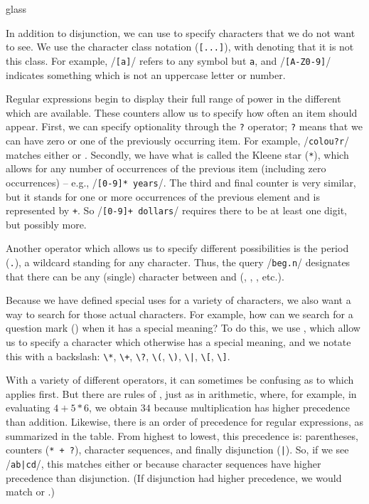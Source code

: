 \begin{tblsfilledsymbol}{}{glass}
\begin{underthehood}
In addition to disjunction, we can use  to specify
characters that we do not want to see.  We use the character class
notation (\texttt{[...]}), with {\A} denoting that it is not this class.  For example,
/\texttt{[{\A}a]}/ refers to any symbol but \texttt{a}, and
/\texttt{[{\A}A-Z0-9]}/ indicates something which is not an uppercase
letter or number.

Regular expressions begin to display their full range of power in the
different  which are available.  These counters
allow us to specify how often an item should appear.  First, we can
specify optionality through the \texttt{?} operator; \texttt{?} means
that we can have zero or one of the previously occurring item.  For
example, /\texttt{colou?r}/ matches either  or
.  Secondly, we have what is called the Kleene star
(\texttt{*}), which allows for any number of occurrences of the
previous item (including zero occurrences) -- e.g., /\texttt{[0-9]*
  years}/.  The third and final counter is very similar, but it stands
for one or more occurrences of the previous element and is represented
by \texttt{+}.  So /\texttt{[0-9]+ dollars}/ requires there to be at
least one digit, but possibly more.

Another operator which allows us to specify different possibilities is
the period (\texttt{.}), a wildcard standing for any character.  Thus,
the query /\texttt{beg.n}/ designates that there can be any (single)
character between  and  (,
, , etc.).

Because we have defined special uses for a variety of characters, we
also want a way to search for those actual characters.  For example,
how can we search for a question mark () when it has a
special meaning?  To do this, we use ,
which allow us to specify a character which otherwise has a special
meaning, and we notate this with a backslash: \verb#\*#, \verb#\+#,
\verb#\?#, \verb#\(#, \verb#\)#, \verb#\|#, \verb#\[#, \verb#\]#.

With a variety of different operators, it can sometimes be confusing
as to which applies first.  But there are rules of
, just
as in arithmetic, where, for example, in evaluating $4+5*6$, we obtain
$34$ because multiplication has higher precedence than addition.
Likewise, there is an order of precedence for regular expressions, as summarized
in the table.  From highest to lowest, this precedence is:
parentheses, counters (\texttt{* + ?}), character sequences, and
finally disjunction (\texttt{|}).  So, if we see 
/\texttt{ab|cd}/, this matches either  or 
because character sequences have higher precedence than disjunction.
(If disjunction had higher precedence, we would match  or
.)


\end{underthehood}
\end{tblsfilledsymbol}
